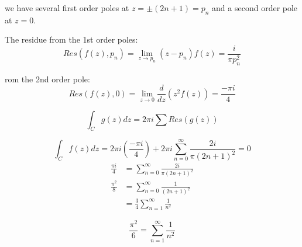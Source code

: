 \documentclass[12pt,a4paper]{article}
\numberwithin{equation}{section}
\begin{document}
we have several first order poles at $z=\pm (2n + 1 ) =p_n$ and a second order pole at $z=0$.

The residue from the 1st order poles:
\begin{equation}
Res(f(z),p_n) = \lim_{z\rightarrow p_n} (z-p_n) f(z) = \frac{
i}{\pi p_n^2}
\end{equation}

rom the 2nd order pole:
\begin{equation}
Res(f(z),0) = \lim_{z\rightarrow 0} \frac{d}{dz} (z^2 f(z)) = \frac{-\pi i}{4}
\end{equation}

\begin{equation}
\int_C g(z) dz = 2\pi i \sum Res(g(z))
\end{equation}

\begin{equation}
\int_C f(z) dz = 2 \pi i \left(  \frac{
-\pi i}{4} \right) + 2 \pi i \sum_{n=0}^\infty \frac{2i}{\pi (2n+1)^2} = 0
\end{equation}
\begin{align}
\frac{\pi i }{4} &= \sum_{n=0}^\infty \frac{2i}{\pi (2n+1)^2} \\
\frac{\pi^2}{8} &= \sum_{n=0}^\infty \frac{1}{(2n+1)^2}\\
&= \frac{3}{4}\sum_{n=1}^\infty \frac{1}{n^2}
\end{align}

\begin{equation}
\frac{\pi^2}{6} = \sum_{n=1}^\infty \frac{1}{n^2}
\end{equation}
\end{document}
